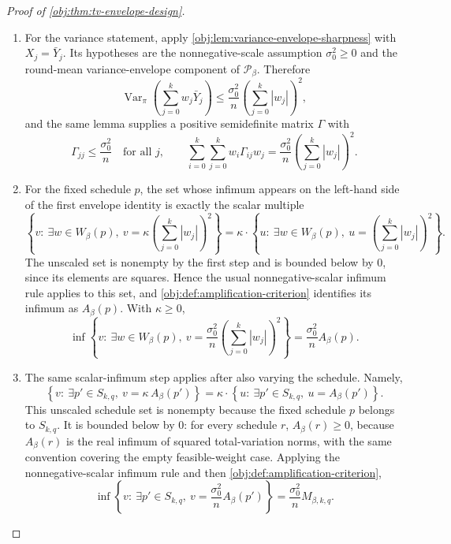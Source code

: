 \begin{proof}[Proof of \cref{obj:thm:tv-envelope-design}]
\begin{enumerate}
\item
For the variance statement, apply \cref{obj:lem:variance-envelope-sharpness} with \(X_j=\bar Y_j\). Its hypotheses are the nonnegative-scale assumption \(\sigma_0^2\ge0\) and the round-mean variance-envelope component of \(\mathcal P_\beta\). Therefore
\[
\operatorname{Var}_\pi\!\left(\sum_{j=0}^k w_j\bar Y_j\right)
\le
\frac{\sigma_0^2}{n}\left(\sum_{j=0}^k |w_j|\right)^2,
\]
and the same lemma supplies a positive semidefinite matrix \(\Gamma\) with
\[
\Gamma_{jj}\le \frac{\sigma_0^2}{n}
\quad\text{for all }j,
\qquad
\sum_{i=0}^k\sum_{j=0}^k w_i\Gamma_{ij}w_j
=
\frac{\sigma_0^2}{n}\left(\sum_{j=0}^k |w_j|\right)^2 .
\] %

\item
For the fixed schedule \(p\), the set whose infimum appears on the left-hand side of the first envelope identity is exactly the scalar multiple
\[
\left\{
v:\ \exists w\in W_\beta(p),\
v=\kappa\left(\sum_{j=0}^k |w_j|\right)^2
\right\}
=
\kappa\cdot\left\{u:\ \exists w\in W_\beta(p),\ u=\left(\sum_{j=0}^k |w_j|\right)^2\right\}.
\]
The unscaled set is nonempty by the first step and is bounded below by \(0\), since its elements are squares. Hence the usual nonnegative-scalar infimum rule applies to this set, and \cref{obj:def:amplification-criterion} identifies its infimum as \(A_\beta(p)\). With \(\kappa\ge0\),
\[
\inf\left\{
v:\ \exists w\in W_\beta(p),\
v=\frac{\sigma_0^2}{n}\left(\sum_{j=0}^k |w_j|\right)^2
\right\}
=
\frac{\sigma_0^2}{n}A_\beta(p).
\] %

\item
The same scalar-infimum step applies after also varying the schedule. Namely,
\[
\left\{
v:\ \exists p'\in S_{k,q},\
v=\kappa\,A_\beta(p')
\right\}
=
\kappa\cdot\left\{u:\ \exists p'\in S_{k,q},\ u=A_\beta(p')
\right\}.
\]
This unscaled schedule set is nonempty because the fixed schedule \(p\) belongs to \(S_{k,q}\). It is bounded below by \(0\): for every schedule \(r\), \(A_\beta(r)\ge0\), because \(A_\beta(r)\) is the real infimum of squared total-variation norms, with the same convention covering the empty feasible-weight case. Applying the nonnegative-scalar infimum rule and then \cref{obj:def:amplification-criterion},
\[
\inf\left\{
v:\ \exists p'\in S_{k,q},\
v=\frac{\sigma_0^2}{n}A_\beta(p')
\right\}
=
\frac{\sigma_0^2}{n}M_{\beta,k,q}.
\] %


\end{enumerate}
\end{proof}

